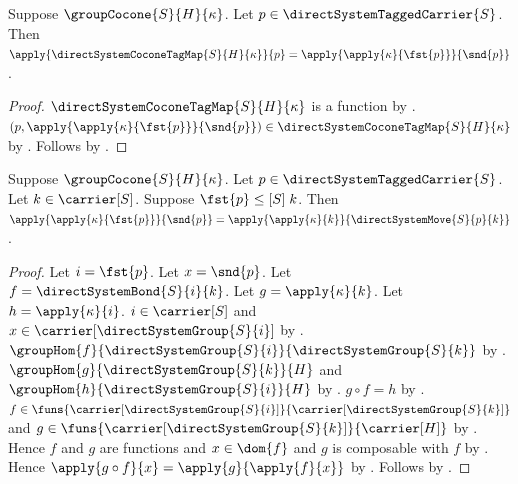 \begin{proposition}\label{direct_system_cocone_tag_map_apply}
    Suppose $\groupCocone{S}{H}{\kappa}$.
    Let $p\in\directSystemTaggedCarrier{S}$.
    Then $\apply{\directSystemCoconeTagMap{S}{H}{\kappa}}{p}
        =\apply{\apply{\kappa}{\fst{p}}}{\snd{p}}$.
\end{proposition}
\begin{proof}
    $\directSystemCoconeTagMap{S}{H}{\kappa}$ is a function by
        .
    $(p,\apply{\apply{\kappa}{\fst{p}}}{\snd{p}})
        \in\directSystemCoconeTagMap{S}{H}{\kappa}$ by
        .
    Follows by .
\end{proof}

\begin{lemma}\label{group_cocone_value_after_move}
    Suppose $\groupCocone{S}{H}{\kappa}$.
    Let $p\in\directSystemTaggedCarrier{S}$.
    Let $k\in\carrier[S]$.
    Suppose $\fst{p}\mathrel{\leq[S]}k$.
    Then
        $\apply{\apply{\kappa}{\fst{p}}}{\snd{p}}
        =\apply{\apply{\kappa}{k}}{\directSystemMove{S}{p}{k}}$.
\end{lemma}
\begin{proof}
    Let $i=\fst{p}$.
    Let $x=\snd{p}$.
    Let $f=\directSystemBond{S}{i}{k}$.
    Let $g=\apply{\kappa}{k}$.
    Let $h=\apply{\kappa}{i}$.
    $i\in\carrier[S]$ and
        $x\in\carrier[\directSystemGroup{S}{i}]$ by
        .
    $\groupHom{f}{\directSystemGroup{S}{i}}
        {\directSystemGroup{S}{k}}$ by
        .
    $\groupHom{g}{\directSystemGroup{S}{k}}{H}$ and
        $\groupHom{h}{\directSystemGroup{S}{i}}{H}$ by
        .
    $g\circ f=h$ by
        .
    $f\in\funs{\carrier[\directSystemGroup{S}{i}]}
        {\carrier[\directSystemGroup{S}{k}]}$ and
        $g\in\funs{\carrier[\directSystemGroup{S}{k}]}{\carrier[H]}$ by
        .
    Hence $f$ and $g$ are functions and $x\in\dom{f}$ and
        $g$ is composable with $f$ by
        .
    Hence $\apply{g\circ f}{x}=\apply{g}{\apply{f}{x}}$ by
        .
    Follows by .
\end{proof}

